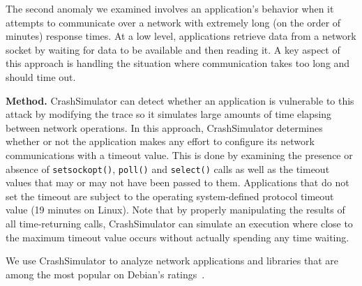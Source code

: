 The second anomaly we examined
involves an application's behavior when it attempts to communicate over a network
with extremely long (on the order of minutes) response times.  At a low level,
applications retrieve data from a network socket by waiting for data to be
available and then reading it.  A key aspect of this approach is handling the 
situation where communication takes too long and should time out.

{\bf Method.}
CrashSimulator can detect whether an application is vulnerable to this attack by
modifying
the trace so it simulates large
amounts of time elapsing between network operations.
In this approach, CrashSimulator determines
whether or not the application makes any effort to configure its network
communications with a timeout value. This is done by examining the presence or
absence of {\tt setsockopt()}, {\tt poll()} and {\tt select()} calls as well as
the timeout values that may or may not have been passed to them. Applications
that do not set the timeout are subject to the operating
system-defined protocol timeout value (19 minutes on Linux).
Note that by properly manipulating the results of all
time-returning calls, CrashSimulator can simulate an execution where close to
the maximum timeout value occurs without actually spending any time
waiting.


We use CrashSimulator to analyze  network applications and libraries
that are among the most popular on Debian's ratings~\cite{DebPopCon}. 

